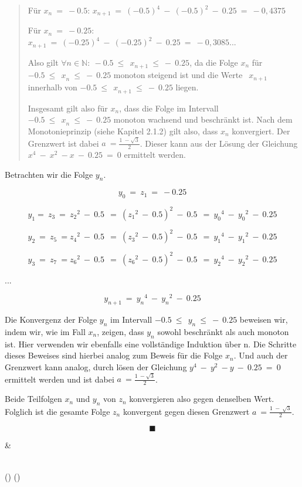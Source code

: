 \documentclass{book}
\begin{document}
\begin{longtable}[]
\begin{minipage}[b]{\linewidth}
\begin{quote}
Für \(x_{n}\  = \  - 0.5\):
\(x_{n + 1}\  = \ {( - 0.5)}^{4}\  - \ {( - 0.5)}^{2}\  - \ 0.25\  = \  - 0,4375\)

Für \(x_{n}\  = \  - 0.25\):
\(x_{n + 1}\  = \ {( - 0.25)}^{4}\  - \ {( - 0.25)}^{2}\  - \ 0.25\  = \  - 0,3085...\)

Also gilt
\(\forall n \in \mathbb{N:\ } - 0.5\ {\leq \ \ x}_{n + 1}\  \leq \  - \ 0.25\),
da die Folge \(x_{n}\) für
\(- 0.5\ {\leq \ \ x}_{n}\  \leq \  - \ 0.25\) monoton steigend ist und
die Werte \({\ \ x}_{n + 1}\) innerhalb von
\(- 0.5\ {\leq \ \ x}_{n + 1}\  \leq \  - \ 0.25\) liegen.

Insgesamt gilt also für \(x_{n}\), dass die Folge im Intervall
\(- 0.5\ {\leq \ \ x}_{n}\  \leq \  - \ 0.25\) monoton wachsend und
beschränkt ist. Nach dem Monotonieprinzip (siehe Kapitel 2.1.2) gilt
also, dass \(x_{n}\) konvergiert. Der Grenzwert ist dabei
\(a\  = \frac{1\  - \sqrt{3}}{2}\). Dieser kann aus der Lösung der
Gleichung \(x^{4}\  - \ x^{2}\  - x\  - \ 0.25\  = \ 0\) ermittelt
werden.
\end{quote}

Betrachten wir die Folge \(y_{n}\).

\[y_{0}\  = \ z_{1}\  = \  - 0.25\]

\[y_{1}{= \ z}_{3}\  = \ {z_{2}}^{2}\  - \ 0.5\ \  = \ ({z_{1}}^{2}\  - \ 0.5)^{2}\  - \ 0.5\ \  = \ {y_{0}}^{4}\  - \ {y_{0}}^{2}\  - \ 0.25\]

\[y_{2}\  = \ z_{5}\  = {z_{4}}^{2}\  - \ 0.5\ \  = \ ({z_{3}}^{2}\  - \ 0.5)^{2}\  - \ 0.5\ \  = \ {y_{1}}^{4}\  - \ {y_{1}}^{2}\  - \ 0.25\]

\[y_{3}\  = \ z_{7}\  = {z_{6}}^{2}\  - \ 0.5\ \  = \ ({z_{6}}^{2}\  - \ 0.5)^{2}\  - \ 0.5\ \  = \ {y_{2}}^{4}\  - \ {y_{2}}^{2}\  - \ 0.25\]

...

\[y_{n + 1}\  = \ {y_{n}}^{4}\  - \ {y_{n}}^{2}\  - \ 0.25\]

Die Konvergenz der Folge \(y_{n}\) im Intervall
\(- 0.5\ {\leq \ \ y}_{n}\  \leq \  - \ 0.25\) beweisen wir, indem wir,
wie im Fall \(x_{n}\), zeigen, dass \(y_{n}\) sowohl beschränkt als auch
monoton ist. Hier verwenden wir ebenfalls eine vollständige Induktion
über n. Die Schritte dieses Beweises sind hierbei analog zum Beweis für
die Folge \(x_{n}\). Und auch der Grenzwert kann analog, durch lösen der
Gleichung \(y^{4}\  - \ y^{2}\  - y\  - \ 0.25\  = \ 0\) ermittelt
werden und ist dabei \(a\  = \frac{1\  - \sqrt{3}}{2}\).

Beide Teilfolgen \(x_{n}\) und \(y_{n}\) von \(z_{n}\) konvergieren also
gegen denselben Wert. Folglich ist die gesamte Folge \(z_{n}\)
konvergent gegen diesen Grenzwert \(a\  = \frac{1\  - \ \sqrt{3}}{2}\).

\[\blacksquare\]
\end{minipage} & \begin{minipage}[b]{\linewidth}\raggedright
\end{minipage} \\
\midrule()
\endhead
\bottomrule()
\end{longtable}
\end{document}
